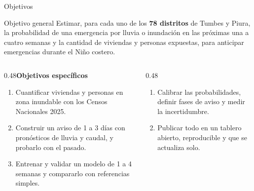 \documentclass[aspectratio=169,11pt]{beamer}
\begin{document}
\begin{frame}{Objetivos}
\begin{caja}{Objetivo general}
Estimar, para cada uno de los \textbf{78 distritos} de Tumbes y Piura, la probabilidad de una emergencia por lluvia o inundación en las próximas una a cuatro semanas y la cantidad de viviendas y personas expuestas, para anticipar emergencias durante el Niño costero.
\end{caja}
\vspace{0.3em}
\begin{columns}[T]
\begin{column}{0.48\textwidth}\small\textbf{Objetivos específicos}
\begin{enumerate}\footnotesize
\item Cuantificar viviendas y personas en zona inundable con los Censos Nacionales 2025.
\item Construir un aviso de 1 a 3 días con pronósticos de lluvia y caudal, y probarlo con el pasado.
\item Entrenar y validar un modelo de 1 a 4 semanas y compararlo con referencias simples.
\end{enumerate}
\end{column}
\begin{column}{0.48\textwidth}
\vspace{1.1em}\begin{enumerate}\footnotesize\setcounter{enumi}{3}
\item Calibrar las probabilidades, definir fases de aviso y medir la incertidumbre.
\item Publicar todo en un tablero abierto, reproducible y que se actualiza solo.
\end{enumerate}
\end{column}
\end{columns}
\end{frame}
\end{document}
